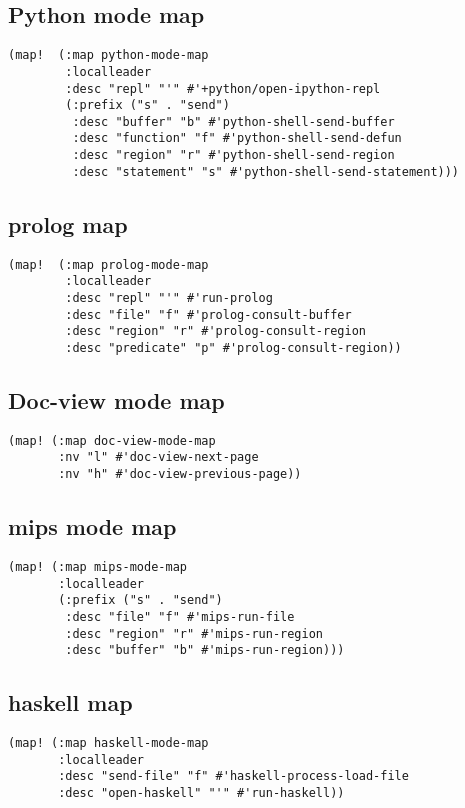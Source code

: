 \documentclass[11pt]{article}
\begin{document}
\subsection{Python mode map}
\label{sec:org0c34736}
\begin{verbatim}
(map!  (:map python-mode-map
        :localleader
        :desc "repl" "'" #'+python/open-ipython-repl
        (:prefix ("s" . "send")
         :desc "buffer" "b" #'python-shell-send-buffer
         :desc "function" "f" #'python-shell-send-defun
         :desc "region" "r" #'python-shell-send-region
         :desc "statement" "s" #'python-shell-send-statement)))
\end{verbatim}
\subsection{prolog map}
\label{sec:org35eb9b1}
\begin{verbatim}
(map!  (:map prolog-mode-map
        :localleader
        :desc "repl" "'" #'run-prolog
        :desc "file" "f" #'prolog-consult-buffer
        :desc "region" "r" #'prolog-consult-region
        :desc "predicate" "p" #'prolog-consult-region))
\end{verbatim}

\subsection{Doc-view mode map}
\label{sec:orgcdec8d9}
\begin{verbatim}
(map! (:map doc-view-mode-map
       :nv "l" #'doc-view-next-page
       :nv "h" #'doc-view-previous-page))
\end{verbatim}
\subsection{mips mode map}
\label{sec:org6c656e4}
\begin{verbatim}
(map! (:map mips-mode-map
       :localleader
       (:prefix ("s" . "send")
        :desc "file" "f" #'mips-run-file
        :desc "region" "r" #'mips-run-region
        :desc "buffer" "b" #'mips-run-region)))
\end{verbatim}
\subsection{haskell map}
\label{sec:org2af2747}
\begin{verbatim}
(map! (:map haskell-mode-map
       :localleader
       :desc "send-file" "f" #'haskell-process-load-file
       :desc "open-haskell" "'" #'run-haskell))
\end{verbatim}
\end{document}
